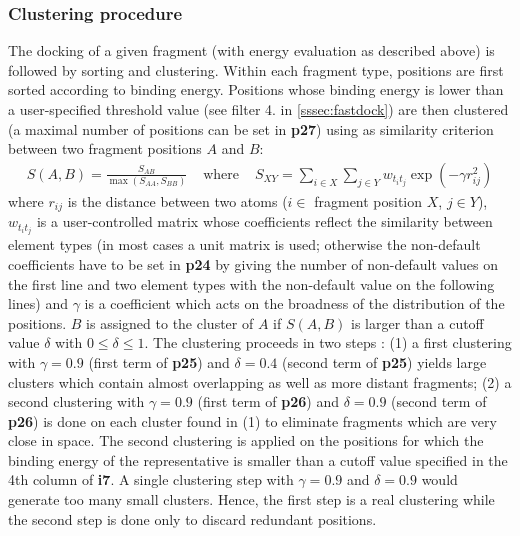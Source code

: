 \documentclass[a4paper,12pt,titlepage]{article}
\begin{document}

\subsubsection{Clustering procedure}
\label{sssec:Clustering}

The docking of a given fragment (with energy evaluation as 
described above) is followed by sorting and clustering.  Within each fragment type, 
positions are first sorted according to binding energy.  Positions
whose binding energy is lower than a user-specified threshold value 
(see filter 4. in \ref{sssec:fastdock}) are
then clustered (a maximal number of positions can be set in {\bf p27}) using as similarity criterion 
between two fragment positions $A$ and $B$: 
\begin{eqnarray}
S(A,B)=\frac{S_{AB}}{\max (S_{AA},S_{BB})} & \mbox{ where } & 
    S_{XY}=\sum_{i \in X} \sum_{j \in Y} w_{t_i t_j} \exp (- \gamma r^2_{ij})
\end{eqnarray}
where
$r_{ij}$ is the distance between two atoms ($i \in$ fragment position $X$, 
$j \in Y$), $w_{t_i t_j}$ is a user-controlled matrix whose coefficients 
reflect the similarity between element types (in most cases a unit matrix is used; 
otherwise the non-default coefficients have to be set in {\bf p24} by giving the number of non-default 
values on the first line and two element types with the non-default value on the following lines) 
and $\gamma$ is a coefficient which acts on the broadness of the distribution
of the positions.  $B$ is assigned to the cluster of 
$A$ if $S(A,B)$ is larger than a cutoff value $\delta$ with $0 \leq \delta \leq 
1$. 
The clustering proceeds in two steps :
(1) a first clustering with $\gamma=0.9$ (first term of {\bf p25}) and $\delta=0.4$ 
(second term of {\bf p25}) yields 
large clusters which contain almost overlapping as well as more distant fragments; 
(2) a second clustering with $\gamma=0.9$ (first term of {\bf p26}) and $\delta=0.9$ 
(second term of {\bf p26}) is done on each 
cluster found in (1) to eliminate fragments which are very close in space. 
The second clustering is applied on the positions for which the binding energy of the representative 
is smaller than a cutoff value specified in the 4th column of {\bf i7}. 
A single clustering step with $\gamma=0.9$ and $\delta=0.9$ would generate 
too many small clusters. Hence, the first step is a real clustering while the 
second step is done only to discard redundant positions. 
\end{document}
